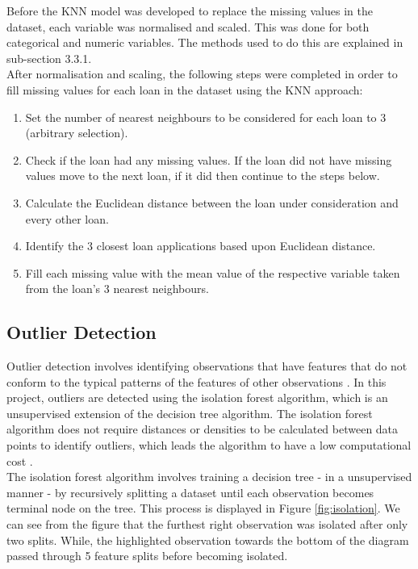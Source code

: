 \vspace{10pt}

Before the KNN model was developed to replace the missing values in the dataset, each variable was normalised and scaled. This was done for both categorical and numeric variables. The methods used to do this are explained in sub-section 3.3.1.\\

After normalisation and scaling, the following steps were completed in order to fill missing values for each loan in the dataset using the KNN approach: 

\begin{enumerate}
    \item Set the number of nearest neighbours to be considered for each loan to 3 (arbitrary selection).
    \item Check if the loan had any missing values. If the loan did not have missing values move to the next loan, if it did then continue to the steps below. 
    \item Calculate the Euclidean distance between the loan under consideration and every other loan. 
    \item Identify the 3 closest loan applications based upon Euclidean distance. 
    \item Fill each missing value with the mean value of the respective variable taken from the loan's 3 nearest neighbours. 
\end{enumerate}

\subsection{Outlier Detection}

Outlier detection involves identifying observations that have features that do not conform to the typical patterns of the features of other observations \parencite{Outlier1}. In this project, outliers are detected using the isolation forest algorithm, which is an unsupervised extension of the decision tree algorithm. The isolation forest algorithm does not require distances or densities to be calculated between data points to identify outliers, which leads the algorithm to have a low computational cost \parencite{Outlier2}.  \\

The isolation forest algorithm involves training a decision tree - in a unsupervised manner - by recursively splitting a dataset until each observation becomes terminal node on the tree. This process is displayed in Figure \ref{fig:isolation}. We can see from the figure that the furthest right observation was isolated after only two splits. While, the highlighted observation towards the bottom of the diagram passed through 5 feature splits before becoming isolated. \\


